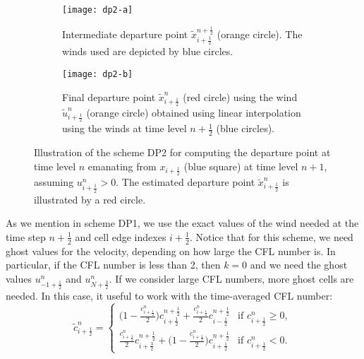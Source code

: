 \begin{figure}[!htb]
	\centering	
	\begin{subfigure}{0.6\textwidth}
		\centering
		\texttt{[image: dp2-a]}
		\caption{Intermediate departure point $\tilde{x}_{i+\frac{1}{2}}^{n+\frac{1}{2}}$ (orange circle). The winds used are depicted by blue circles.\label{dp2-fig-1}}
	\end{subfigure}
	
	\begin{subfigure}{0.6\textwidth}
		\centering
		\texttt{[image: dp2-b]}
		\caption{Final departure point $\tilde{x}_{i+\frac{1}{2}}^n$ (red circle) using the wind $\tilde{u}_{i+\frac{1}{2}}^n$ (orange circle) obtained using linear interpolation using the winds at time level $n+\frac{1}{2}$ (blue circles). \label{dp2-fig-2}}
	\end{subfigure}
	\caption{ Illustration of the scheme DP2 for computing the departure point at time level $n$ emanating from $x_{i+\frac{1}{2}}$ (blue square) at time level $n+1$, assuming ${u}_{i+\frac{1}{2}}^n>0$.
			The estimated departure point $\tilde{x}_{i+\frac{1}{2}}^n$ is illustrated by a red circle. \label{dp2-fig}}
\end{figure}


As we mention in scheme DP1, we use the exact values of the wind needed at the time step $n+\frac{1}{2}$ and cell edge indexes $i+\frac{1}{2}$.
Notice that for this scheme, we need ghost values for the velocity, depending on how large the CFL number is.
In particular, if the CFL number is less than 2, then $k=0$ and we need the ghost values $u_{-1+\frac{1}{2}}^n$ and $u_{N+\frac{3}{2}}^n$.
If we consider large CFL numbers, more ghost cells are needed.
In this case, it useful to work with the time-averaged CFL number:
\begin{equation}
	\label{cfl-dp2}
	\tilde{c}^n_{i+\frac{1}{2}} =
	\begin{cases}
		\bigg(1-\frac{c_{i+\frac{1}{2}}^n}{2} \bigg)c^{n+\frac{1}{2}}_{i+\frac{1}{2}} +
		\frac{c_{i+\frac{1}{2}}^n}{2} c^{n+\frac{1}{2}}_{i-\frac{1}{2}} & \text{if } {c}^n_{i+\frac{1}{2}}\geq 0,\\
		\frac{c_{i+\frac{1}{2}}^n}{2} c^{n+\frac{1}{2}}_{i+\frac{3}{2}} + \bigg(1-\frac{c_{i+\frac{1}{2}}^n}{2}\bigg)
		c^{n+\frac{1}{2}}_{i+\frac{1}{2}} & \text{if } {c}^n_{i+\frac{1}{2}} < 0.\
	\end{cases}
\end{equation}


